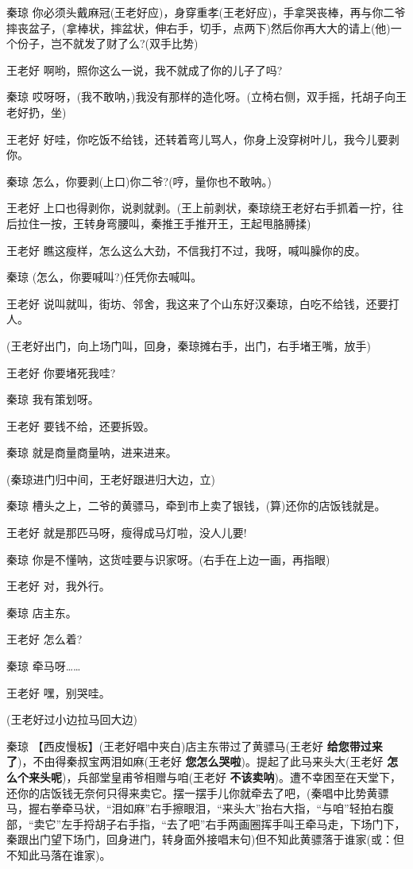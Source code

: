 秦琼
你必须头戴麻冠(王老好应)，身穿重孝(王老好应)，手拿哭丧棒，再与你二爷摔丧盆子，(拿棒状，摔盆状，伸右手，切手，点两下)然后你再大大的请上(他)一个份子，岂不就发了财了么?(双手比势)

王老好 啊哟，照你这么一说，我不就成了你的儿子了吗?

秦琼
哎呀呀，(我不敢呐，)我没有那样的造化呀。(立椅右侧，双手摇，托胡子向王老好扔，坐)

王老好
好哇，你吃饭不给钱，还转着弯儿骂人，你身上没穿树叶儿，我今儿要剥你。

秦琼 怎么，你要剥(上口)你二爷?(哼，量你也不敢呐。)

王老好
上口也得剥你，说剥就剥。(王上前剥状，秦琼绕王老好右手抓着一拧，往后拉住一按，王转身弯腰叫，秦推王手推开王，王起甩胳膊揉)

王老好 瞧这瘦样，怎么这么大劲，不信我打不过，我呀，喊叫臊你的皮。

秦琼 (怎么，你要喊叫?)任凭你去喊叫。

王老好
说叫就叫，街坊、邻舍，我这来了个山东好汉秦琼，白吃不给钱，还要打人。

(王老好出门，向上场门叫，回身，秦琼摊右手，出门，右手堵王嘴，放手)

王老好 你要堵死我哇?

秦琼 我有策划呀。

王老好 要钱不给，还要拆毁。

秦琼 就是商量商量呐，进来进来。

(秦琼进门归中间，王老好跟进归大边，立)

秦琼 槽头之上，二爷的黄骠马，牵到市上卖了银钱，(算)还你的店饭钱就是。

王老好 就是那匹马呀，瘦得成马灯啦，没人儿要!

秦琼 你是不懂呐，这货哇要与识家呀。(右手在上边一画，再指眼)

王老好 对，我外行。

秦琼 店主东。

王老好 怎么着?

秦琼 牵马呀\ldots{}\ldots{}

王老好 嘿，别哭哇。

(王老好过小边拉马回大边)

秦琼 【西皮慢板】(王老好唱中夹白)店主东带过了黄骠马(王老好
\textbf{给您带过来了})，不由得秦叔宝两泪如麻(王老好
\textbf{您怎么哭啦})。提起了此马来头大(王老好
\textbf{怎么个来头呢})，兵部堂皇甫爷相赠与咱(王老好
\textbf{不该卖呐})。遭不幸困至在天堂下，还你的店饭钱无奈何只得来卖它。摆一摆手儿你就牵去了吧，(秦唱中比势黄骠马，握右拳牵马状，``泪如麻''右手擦眼泪，``来头大''抬右大指，``与咱''轻拍右腹部，``卖它''左手捋胡子右手指，``去了吧''右手两画圈挥手叫王牵马走，下场门下，秦跟出门望下场门，回身进门，转身面外接唱末句)但不知此黄骠落于谁家(或：但不知此马落在谁家)。

